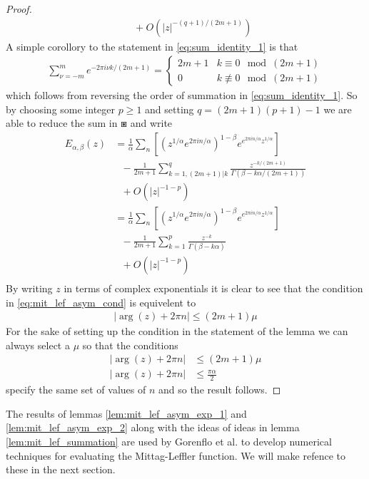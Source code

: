 \begin{proof}
\begin{align}
    & \ \ \ + O\left(|z|^{-(q+1)/(2m+1)} \right)
    \end{align}
    A simple corollory to the statement in \eqref{eq:sum_identity_1} is that
    \begin{align}
        \sum_{\nu = -m}^{m} e^{-2\pi i \nu k / (2m + 1)} = 
        \begin{cases}
            2m+1    & k \equiv 0 \mod (2m + 1) \\
            0       & k \not\equiv 0 \mod (2m + 1) 
        \end{cases}
    \end{align}
    which follows from reversing the order of summation in \eqref{eq:sum_identity_1}. So by choosing some integer $ p \geq 1 $ and setting $ q = (2m+1)(p+1) - 1 $ we are able to reduce the sum in $ \boxast $ and write
     \begin{align}
        E_{\alpha, \beta}(z) &= \frac{1}{\alpha} \sum_{n} \left[ \left(z^{1 / \alpha} e^{2\pi i n / \alpha} \right)^{1-\beta} e^{e^{2\pi i n / \alpha}z^{1 / \alpha} }\right] \\ 
    & \ \ \ - \frac{1}{2m + 1} \sum_{k=1, (2m+1) | k}^q \frac{z^{-k/(2m + 1)}}{\Gamma(\beta - k\alpha / (2m + 1))} \\ 
    & \ \ \ + O\left(|z|^{-1-p} \right) \\
    &= \frac{1}{\alpha} \sum_{n} \left[ \left(z^{1 / \alpha} e^{2\pi i n / \alpha} \right)^{1-\beta} e^{e^{2\pi i n / \alpha}z^{1 / \alpha} }\right] \\ 
    & \ \ \ - \frac{1}{2m + 1} \sum_{k=1}^p \frac{z^{-k}}{\Gamma(\beta - k\alpha)} \\ 
    & \ \ \ + O\left(|z|^{-1-p} \right) \\
    \end{align}  
    By writing $ z $ in terms of complex exponentials it is clear to see that the condition in \eqref{eq:mit_lef_asym_cond} is equivelent to
    \begin{align}
        \left| \arg(z) + 2\pi n \right| \leq (2m + 1)\mu
    \end{align}
    For the sake of setting up the condition in the statement of the lemma we can always select a $ \mu $ so that the conditions
    \begin{align}
        | \arg(z) + 2\pi n| &\leq (2m + 1) \mu \\
        | \arg(z) + 2\pi n| &\leq \frac{\pi \alpha}{2}
    \end{align}
    specify the same set of values of $ n $ and so the result follows. 
\end{proof}
The results of lemmas \ref{lem:mit_lef_asym_exp_1} and \ref{lem:mit_lef_asym_exp_2} along with the ideas of ideas in lemma \ref{lem:mit_lef_summation} are used by 
Gorenflo et al. \cite{Gorenflo2002} to develop numerical techniques for evaluating the Mittag-Leffler function. We will make refence to these in the next section. 


